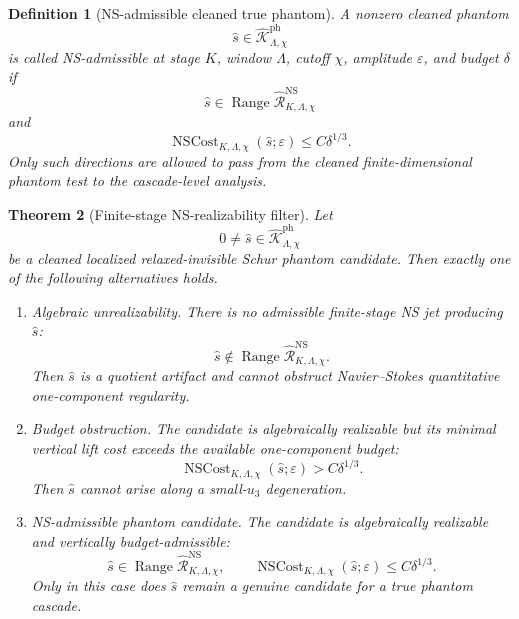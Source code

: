 \documentclass[11pt]{article}
\numberwithin{equation}{section}
\newtheorem{theorem}{Theorem}[section]
\newtheorem{definition}[theorem]{Definition}
\DeclareMathOperator{\Range}{Range}
\begin{document}
\begin{definition}[NS-admissible cleaned true phantom]\label{def:NS-admissible-cleaned-true-phantom}
A nonzero cleaned phantom
\[
        \widehat s\in
        \widehat{\mathcal K}_{\Lambda,\chi}^{\mathrm{ph}}
\]
is called NS-admissible at stage \(K\), window \(\Lambda\), cutoff \(\chi\), amplitude \(\varepsilon\), and budget \(\delta\) if
\[
        \widehat s\in
        \Range \widehat{\mathcal R}_{K,\Lambda,\chi}^{\mathrm{NS}}
\]
and
\[
        \operatorname{NSCost}_{K,\Lambda,\chi}(\widehat s;\varepsilon)
        \le
        C\delta^{1/3}.
\]
Only such directions are allowed to pass from the cleaned finite-dimensional phantom test to the cascade-level analysis.
\end{definition}

\begin{theorem}[Finite-stage NS-realizability filter]\label{thm:finite-stage-NS-realizability-filter}
Let
\[
        0\neq \widehat s\in
        \widehat{\mathcal K}_{\Lambda,\chi}^{\mathrm{ph}}
\]
be a cleaned localized relaxed-invisible Schur phantom candidate.  Then exactly one of the following alternatives holds.
\begin{enumerate}[label=(\roman*)]
\item \emph{Algebraic unrealizability.}  There is no admissible finite-stage NS jet producing \(\widehat s\):
\[
        \widehat s\notin
        \Range \widehat{\mathcal R}_{K,\Lambda,\chi}^{\mathrm{NS}}.
\]
Then \(\widehat s\) is a quotient artifact and cannot obstruct Navier--Stokes quantitative one-component regularity.

\item \emph{Budget obstruction.}  The candidate is algebraically realizable but its minimal vertical lift cost exceeds the available one-component budget:
\[
        \operatorname{NSCost}_{K,\Lambda,\chi}(\widehat s;\varepsilon)
        > C\delta^{1/3}.
\]
Then \(\widehat s\) cannot arise along a small-\(u_3\) degeneration.

\item \emph{NS-admissible phantom candidate.}  The candidate is algebraically realizable and vertically budget-admissible:
\[
        \widehat s\in
        \Range \widehat{\mathcal R}_{K,\Lambda,\chi}^{\mathrm{NS}},
        \qquad
        \operatorname{NSCost}_{K,\Lambda,\chi}(\widehat s;\varepsilon)
        \le
        C\delta^{1/3}.
\]
Only in this case does \(\widehat s\) remain a genuine candidate for a true phantom cascade.
\end{enumerate}
\end{theorem}
\end{document}
